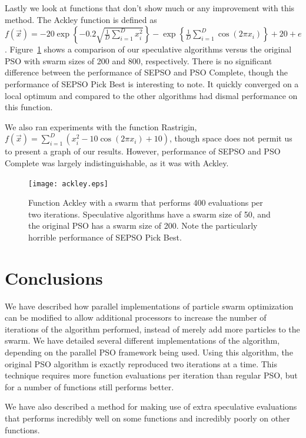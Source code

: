 \documentclass[conference,letterpaper]{IEEEtran}
\newcommand{\fig}[1]{Figure~\ref{fig:#1}}
\begin{document}
Lastly we look at functions that don't show much or any improvement with this
method.  The Ackley function is defined as $f(\Vec{x}) = -20\exp\left\{
-0.2\sqrt{\frac{1}{D}\sum_{i=1}^Dx_i^2}\right\} - \exp\left\{\frac{1}{D}
\sum_{i=1}^D\cos(2\pi x_i)\right\}+20+e$. \fig{ackley} shows a comparison of
our speculative algorithms versus the original PSO with swarm sizes of 200 and
800, respectively.  There is no significant difference between the performance
of SEPSO and PSO Complete, though the performance of SEPSO Pick Best is
interesting to note.  It quickly converged on a local optimum and compared to
the other algorithms had dismal performance on this function.

We also ran experiments with the function Rastrigin, $f(\Vec{x}) = \sum_{i=1}^D
\left(x_i^2 - 10\cos\left(2\pi x_i\right) + 10\right)$,  though space does not
permit us to present a graph of our results.  However, performance of SEPSO and
PSO Complete was largely indistinguishable, as it was with Ackley.

\begin{figure}
  \texttt{[image: ackley.eps]}
  \caption{Function Ackley with a swarm that performs 400 evaluations per
  two iterations.  Speculative algorithms have a swarm size of 50, and the
  original PSO has a swarm size of 200.  Note the particularly horrible
  performance of SEPSO Pick Best.}
  \label{fig:ackley}
\end{figure}


\section{Conclusions}
\label{sec:conclusion}

We have described how parallel implementations of particle swarm optimization
can be modified to allow additional processors to increase the number of
iterations of the algorithm performed, instead of merely add more particles to
the swarm.  We have detailed several different implementations of the
algorithm, depending on the parallel PSO framework being used.  Using this
algorithm, the original PSO algorithm is exactly reproduced two iterations at a
time.  This technique requires more function evaluations per iteration than
regular PSO, but for a number of functions still performs better.

We have also described a method for making use of extra speculative evaluations
that performs incredibly well on some functions and incredibly poorly on other
functions.
\end{document}

